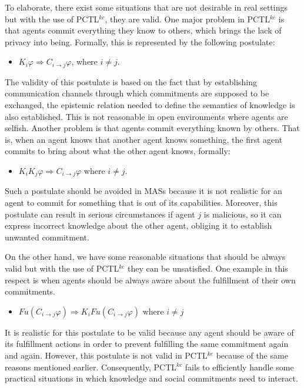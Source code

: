 To elaborate, there exist some situations that are not desirable in real settings but with the use of PCTL$^{kc}$, they are valid. One major problem in PCTL$^{kc}$ is that agents commit everything they know to others, which brings the lack of privacy into being. Formally, this is represented by the following postulate:

\begin{itemize}
\item $K_i \varphi \Rightarrow C_{i \rightarrow j}\varphi$,  where $i \neq j$.
\end{itemize}

The validity of this postulate is based on the fact that by
establishing communication channels through which commitments are
supposed to be exchanged, the epistemic relation needed to define
the semantics of knowledge is also established. This is not
reasonable in open environments where agents are selfish. Another
problem is that agents commit everything known by others. That is,
when an agent knows that another agent knows something, the first
agent commits to bring about what the other agent knows, formally:

\begin{itemize}
\item $ K_i K_j \varphi \Rightarrow C_{i \rightarrow j} \varphi$ where $ i \neq j$.
\end{itemize}

Such a postulate should be avoided in MASs because it is not
realistic for an agent to commit for something that is out of its
capabilities. Moreover, this postulate can result in serious
circumstances if agent $j$ is malicious, so it can express
incorrect knowledge about the other agent, obliging it to
establish unwanted commitment.

On the other hand, we have some reasonable situations that should
be always valid but with the use of PCTL$^{kc}$ they can be
unsatisfied. One example in this respect is when agents should be always aware about the fulfillment of their own commitments.

\begin{itemize}
\item $Fu(C _{i\rightarrow j} \varphi) \Rightarrow K_i Fu(C
_{i\rightarrow j} \varphi)$ where $i \neq j$
\end{itemize}

It is realistic for this postulate to be valid because any agent should be aware of its fulfillment actions in order to prevent fulfilling the same commitment again and again. However, this postulate is not valid in PCTL$^{kc}$ because of the same reasons mentioned earlier. Consequently, PCTL$^{kc}$ fails to efficiently handle some practical situations in which knowledge and social commitments need to interact.

